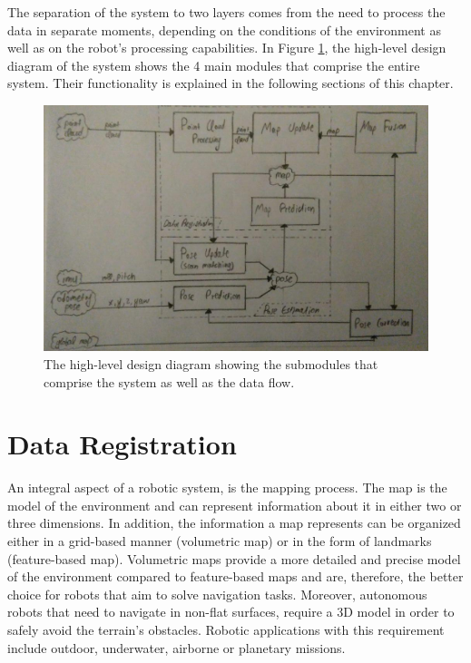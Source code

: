 The separation of the system to two layers comes from the need to process the
data in separate moments, depending on the conditions of the environment as
well as on the robot's processing capabilities.
In Figure \ref{fig:HLD}, the high-level design diagram of the system shows
the 4 main modules that comprise the entire system.
Their functionality is explained in the following sections of this chapter.

\begin{figure}[th]
    \centering
    \includegraphics[scale=0.4]{Figures/high_level_design_diagram}
    \decoRule
    \caption[High Level Design Diagram]{
        The high-level design diagram showing the submodules that comprise
        the system as well as the data flow.}
    \label{fig:HLD}
\end{figure}

\section{Data Registration}

An integral aspect of a robotic system, is the mapping process.
The map is the model of the environment and can represent information about
it in either two or three dimensions.
In addition, the information a map represents can be organized either in
a grid-based manner (volumetric map) or in the form of landmarks
(feature-based map).
Volumetric maps provide a more detailed and precise model of the environment
compared to feature-based maps and are, therefore, the better choice for
robots that aim to solve navigation tasks.
Moreover, autonomous robots that need to navigate in non-flat surfaces,
require a 3D model in order to safely avoid the terrain's obstacles.
Robotic applications with this requirement include outdoor, underwater,
airborne or planetary missions.


